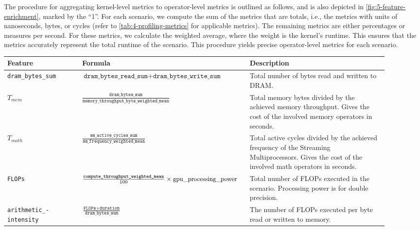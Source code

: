 The procedure for aggregating kernel-level metrics to operator-level metrics is outlined as follows, and is also depicted in \autoref{fig:5-feature-enrichment}, marked by the “1”. For each scenario, we compute the sum of the metrics that are totals, i.e., the metrics with units of nanoseconds, bytes, or cycles (refer to \autoref{tab:4-profiling-metrics} for applicable metrics). The remaining metrics are either percentages or measures per second. For these metrics, we calculate the weighted average, where the weight is the kernel’s runtime. This ensures that the metrics accurately represent the total runtime of the scenario. This procedure yields precise operator-level metrics for each scenario.

\begin{table}[ht]
  \centering
  \begin{tabular}{p{0.19\linewidth}p{0.37\linewidth}>{\footnotesize}p{0.35\linewidth}}
    \toprule
    Feature                                   & Formula                                                                                                 & Description                                                                                                                                       \\
    \midrule\midrule
    \texttt{dram\_bytes\_sum}                 & $\texttt{dram\_bytes\_read\_sum} + \texttt{dram\_bytes\_write\_sum}$                                    & Total number of bytes read and written to DRAM.                                                                                                   \\
    $T_{mem}$                                 & $\frac{\texttt{dram\_bytes\_sum}}{\texttt{memory\_throughput\_byte\_weighted\_mean}}$                   & Total memory bytes divided by the achieved memory throughput. Gives the cost of the involved memory operators in seconds.                         \\
    $T_{math}$                                & $\frac{\texttt{sm\_active\_cycles\_sum}}{\texttt{sm\_frequency\_weighted\_mean}}$                       & Total active cycles divided by the achieved frequency of the Streaming Multiprocessors. Gives the cost of the involved math operators in seconds. \\
    \texttt{FLOPs}                            & $\frac{\texttt{compute\_throughput\_weighted\_mean}}{100} \times \text{\small{gpu\_processing\_power}}$ & Total number of FLOPs executed in the scenario. Processing power is for double precision.                                                         \\
    \texttt{arithmetic\_-} \texttt{intensity} & $\frac{\texttt{FLOPs} \times \texttt{duration}}{\texttt{dram\_bytes\_sum}}$                             & The number of FLOPs executed per byte read or written to memory.                                                                                  \\


\end{tabular}
\end{table}
